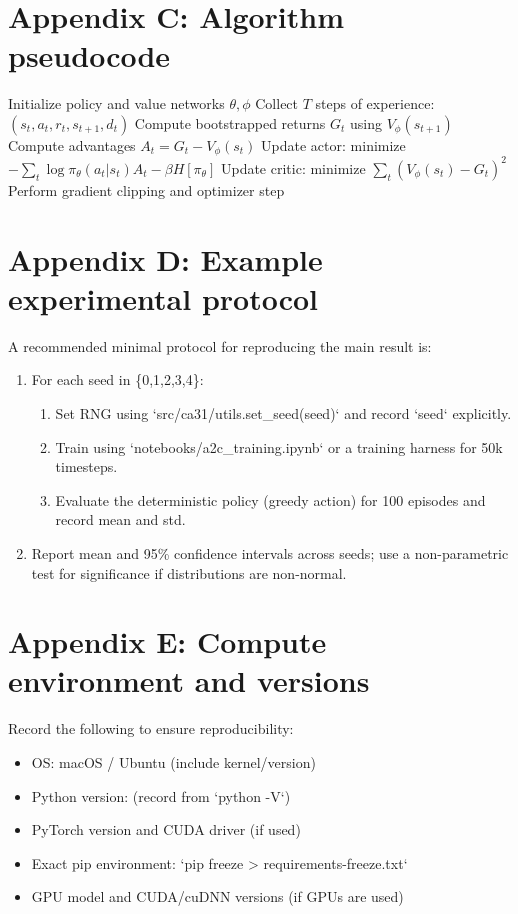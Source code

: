 \documentclass[11pt]{article}
\begin{document}
\section{Appendix C: Algorithm pseudocode}
\begin{algorithm}[h]
\caption{Synchronous A2C (single-process, multi-step rollouts)}
\begin{algorithmic}[1]
\STATE Initialize policy and value networks $\theta, \phi$
  \STATE Collect $T$ steps of experience: $(s_t,a_t,r_t,s_{t+1},d_t)$
  \STATE Compute bootstrapped returns $G_t$ using $V_\phi(s_{t+1})$
  \STATE Compute advantages $A_t = G_t - V_\phi(s_t)$
  \STATE Update actor: minimize $-\sum_t \log\pi_\theta(a_t|s_t) A_t - \beta H[\pi_\theta]$
  \STATE Update critic: minimize $\sum_t (V_\phi(s_t) - G_t)^2$
  \STATE Perform gradient clipping and optimizer step
\ENDFOR
\end{algorithmic}
\end{algorithm}

\section{Appendix D: Example experimental protocol}
A recommended minimal protocol for reproducing the main result is:
\begin{enumerate}
  \item For each seed in \{0,1,2,3,4\}:
    \begin{enumerate}
      \item Set RNG using `src/ca31/utils.set_seed(seed)` and record `seed` explicitly.
      \item Train using `notebooks/a2c_training.ipynb` or a training harness for 50k timesteps.
      \item Evaluate the deterministic policy (greedy action) for 100 episodes and record mean and std.
    \end{enumerate}
  \item Report mean and 95\% confidence intervals across seeds; use a non-parametric test
        for significance if distributions are non-normal.
\end{enumerate}

\section{Appendix E: Compute environment and versions}
Record the following to ensure reproducibility:
\begin{itemize}
  \item OS: macOS / Ubuntu (include kernel/version)
  \item Python version: (record from `python -V`)
  \item PyTorch version and CUDA driver (if used)
  \item Exact pip environment: `pip freeze > requirements-freeze.txt`
  \item GPU model and CUDA/cuDNN versions (if GPUs are used)
\end{itemize}
\end{document}
